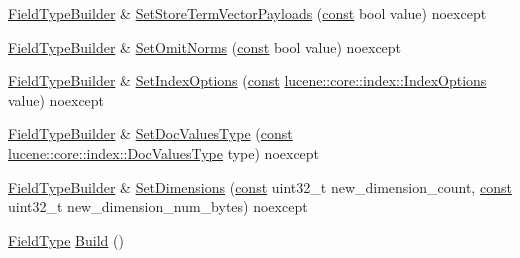 \begin{DoxyCompactItemize}
\item 
\mbox{\hyperlink{classlucene_1_1core_1_1document_1_1FieldTypeBuilder}{Field\+Type\+Builder}} \& \mbox{\hyperlink{classlucene_1_1core_1_1document_1_1FieldTypeBuilder_a99929a6618ccb62254b697b8152070e4}{Set\+Store\+Term\+Vector\+Payloads}} (\mbox{\hyperlink{ZlibCrc32_8h_a2c212835823e3c54a8ab6d95c652660e}{const}} bool value) noexcept
\item 
\mbox{\hyperlink{classlucene_1_1core_1_1document_1_1FieldTypeBuilder}{Field\+Type\+Builder}} \& \mbox{\hyperlink{classlucene_1_1core_1_1document_1_1FieldTypeBuilder_a0353947b265377527127242bd54866ef}{Set\+Omit\+Norms}} (\mbox{\hyperlink{ZlibCrc32_8h_a2c212835823e3c54a8ab6d95c652660e}{const}} bool value) noexcept
\item 
\mbox{\hyperlink{classlucene_1_1core_1_1document_1_1FieldTypeBuilder}{Field\+Type\+Builder}} \& \mbox{\hyperlink{classlucene_1_1core_1_1document_1_1FieldTypeBuilder_a8bac1b342eb1a01f057698f04bb657ec}{Set\+Index\+Options}} (\mbox{\hyperlink{ZlibCrc32_8h_a2c212835823e3c54a8ab6d95c652660e}{const}} \mbox{\hyperlink{namespacelucene_1_1core_1_1index_a0d5e1f98471a76de106056cf3b5a7897}{lucene\+::core\+::index\+::\+Index\+Options}} value) noexcept
\item 
\mbox{\hyperlink{classlucene_1_1core_1_1document_1_1FieldTypeBuilder}{Field\+Type\+Builder}} \& \mbox{\hyperlink{classlucene_1_1core_1_1document_1_1FieldTypeBuilder_afd676ba9b2f4ea66df406f81efc4558c}{Set\+Doc\+Values\+Type}} (\mbox{\hyperlink{ZlibCrc32_8h_a2c212835823e3c54a8ab6d95c652660e}{const}} \mbox{\hyperlink{namespacelucene_1_1core_1_1index_a2f7ffaef6429b5df542c8aa12f8b9883}{lucene\+::core\+::index\+::\+Doc\+Values\+Type}} type) noexcept
\item 
\mbox{\hyperlink{classlucene_1_1core_1_1document_1_1FieldTypeBuilder}{Field\+Type\+Builder}} \& \mbox{\hyperlink{classlucene_1_1core_1_1document_1_1FieldTypeBuilder_afb8590925369c20efe5ac740cf9b347e}{Set\+Dimensions}} (\mbox{\hyperlink{ZlibCrc32_8h_a2c212835823e3c54a8ab6d95c652660e}{const}} uint32\+\_\+t new\+\_\+dimension\+\_\+count, \mbox{\hyperlink{ZlibCrc32_8h_a2c212835823e3c54a8ab6d95c652660e}{const}} uint32\+\_\+t new\+\_\+dimension\+\_\+num\+\_\+bytes) noexcept
\item 
\mbox{\hyperlink{classlucene_1_1core_1_1document_1_1FieldType}{Field\+Type}} \mbox{\hyperlink{classlucene_1_1core_1_1document_1_1FieldTypeBuilder_a3f12e4d22465ea51c7f472b95bfdc748}{Build}} ()
\end{DoxyCompactItemize}
